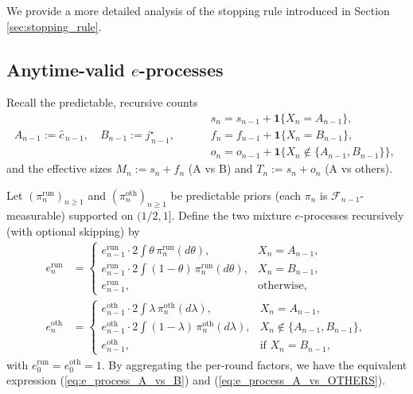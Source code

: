 We provide a more detailed analysis of the stopping rule introduced in Section \ref{sec:stopping_rule}.

\subsection{Anytime-valid $e$-processes}
\label{subsec_app:mmc_recursive}

Recall the predictable, recursive counts
\[
A_{n-1}:=\widehat c_{\,n-1},\quad B_{n-1}:=j^\star_{\,n-1},\qquad
\begin{aligned}
&s_n=s_{n-1}+\mathbf 1\{X_n=A_{n-1}\},\\
&f_n=f_{n-1}+\mathbf 1\{X_n=B_{n-1}\},\\
&o_n=o_{n-1}+\mathbf 1\{X_n\notin\{A_{n-1},B_{n-1}\}\},
\end{aligned}
\]
and the effective sizes \(M_n:=s_n+f_n\) (A vs B) and \(T_n:=s_n+o_n\) (A vs others).


Let $(\pi^{\mathrm{run}}_n)_{n\ge1}$ and $(\pi^{\mathrm{oth}}_n)_{n\ge1}$ be  {predictable} priors (each $\pi_n$ is $\mathcal F_{n-1}$-measurable) 
supported on $(1/2,1]$.
Define the two mixture $e$-processes recursively (with optional skipping) by
\begin{align*}
e^{\mathrm{run}}_n
&=\begin{cases}
e^{\mathrm{run}}_{n-1}\cdot 2\!\displaystyle\int \theta\,\pi^{\mathrm{run}}_n(d\theta), & X_n = A_{n-1},\\[1mm]
e^{\mathrm{run}}_{n-1}\cdot 2\!\displaystyle\int (1-\theta)\,\pi^{\mathrm{run}}_n(d\theta), & X_n = B_{n-1},\\[1mm]
e^{\mathrm{run}}_{n-1}, & \text{otherwise,}
\end{cases}\\[2mm]
e^{\mathrm{oth}}_n
&=\begin{cases}
e^{\mathrm{oth}}_{n-1}\cdot 2\!\displaystyle\int \lambda\,\pi^{\mathrm{oth}}_n(d\lambda), & X_n = A_{n-1},\\[1mm]
e^{\mathrm{oth}}_{n-1}\cdot 2\!\displaystyle\int (1-\lambda)\,\pi^{\mathrm{oth}}_n(d\lambda), & X_n \notin \{A_{n-1},B_{n-1}\},\\[1mm]
e^{\mathrm{oth}}_{n-1}, & \text{if } X_n = B_{n-1},
\end{cases}
\end{align*}
with $e^{\mathrm{run}}_0=e^{\mathrm{oth}}_0=1$.
By aggregating the per-round factors, we have the equivalent expression (\ref{eq:e_process_A_vs_B}) and (\ref{eq:e_process_A_vs_OTHERS}).


